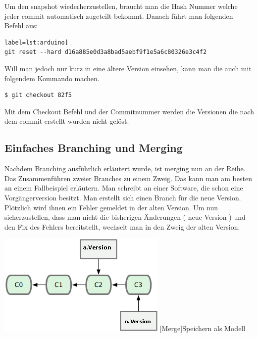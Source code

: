 \documentclass[12pt,a4paper,bibliography=totocnumbered,listof=totocnumbered]{scrartcl}
\begin{document}
Um den snapshot wiederherzustellen, braucht man die Hash Nummer welche jeder commit automatisch zugeteilt bekommt.
Danach führt man  folgenden Befehl aus:

\begin{lstlisting}[caption=snapshot wiederherstellen (wird gelöst)] label=lst:arduino]
git reset --hard d16a885e0d3a8bad5aebf9f1e5a6c80326e3c4f2
\end{lstlisting}

Will man jedoch nur kurz in eine ältere Version einsehen, kann man die auch mit folgendem Kommando machen.

\begin{lstlisting}[caption=snapshot wiederherstellen (wird nicht gelöscht)]
$ git checkout 82f5
\end{lstlisting}

Mit dem Checkout Befehl und der Commitnummer werden die Versionen die nach dem commit erstellt wurden nicht gelöst.  
	
\subsection{Einfaches Branching und Merging}
Nachdem Branching ausführlich erläutert wurde, ist merging  nun an der Reihe. Das Zusammenführen zweier Branches zu einem Zweig.
Das kann man am besten an einem Fallbeispiel erläutern. 
Man schreibt an einer Software, die schon eine Vorgängerversion besitzt. 
Man erstellt sich einen Branch für die neue Version. 
Plötzlich wird ihnen ein Fehler gemeldet in der alten Version. Um nun sicherzustellen, dass man nicht die bisherigen Änderungen ( neue Version ) und den Fix des Fehlers bereitstellt, wechselt man in den Zweig der alten Version. 

\vspace{1em}
\begin{minipage}{\linewidth}
	\centering
	\includegraphics[width=0.5\linewidth]{Bilder/merge.png}
	[Merge]{Speichern als Modell\footnotemark }
	\label{Speichern als Modell}
\end{minipage} 	
\end{document}
